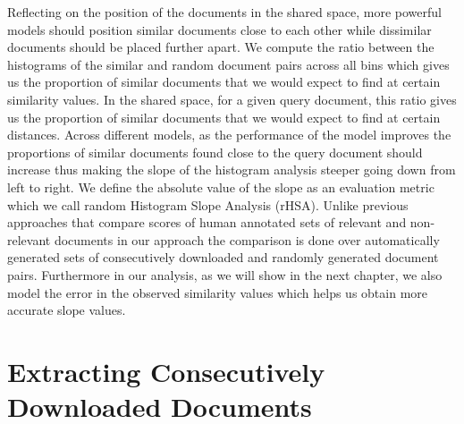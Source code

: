 \documentclass[letterpaper]{article}
\begin{document}
Reflecting on the position of the documents in the shared space, more powerful models should position similar documents close to each other while dissimilar documents should be placed further apart. We compute the ratio between the histograms of the similar and random document pairs across all bins which gives us the proportion of similar documents that we would expect to find at certain similarity values. In the shared space, for a given query document, this ratio gives us the proportion of similar documents that we would expect to find at certain distances. Across different models, as the performance of the model improves the proportions of similar documents found close to the query document should increase thus making the slope of the histogram analysis steeper going down from left to right. We define the absolute value of the slope as an evaluation metric which we call random Histogram Slope Analysis (rHSA). Unlike previous approaches that compare scores of human annotated sets of relevant and non-relevant documents \cite{Krstovski:2015} in our approach the comparison is done over automatically generated sets of consecutively downloaded and randomly generated document pairs. Furthermore in our analysis, as we will show in the next chapter,  we also model the error in the observed similarity values which helps us obtain more accurate slope values.

\section{Extracting Consecutively Downloaded Documents}
\end{document}
